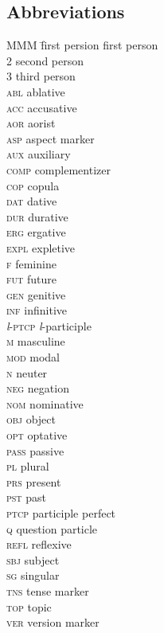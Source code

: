\documentclass[output=paper,colorlinks,citecolor=brown]{langscibook}
\begin{document}
\begin{otherlanguage}{english}
\section*{Abbreviations}
\begin{multicols}{3}
\begin{tabbing}
MMM \= first persion \> first person \\
2 \> second person \\
3 \> third person \\
\textsc{abl} \> ablative \\
\textsc{acc} \> accusative \\
\textsc{aor} \> aorist \\
\textsc{asp} \> aspect marker \\
\textsc{aux} \> auxiliary \\
\textsc{comp} \> complementizer \\
\textsc{cop} \> copula \\
\textsc{dat} \> dative \\
\textsc{dur} \> durative \\
\textsc{erg} \> ergative \\
\textsc{expl} \> expletive \\
\textsc{f} \> feminine \\
\textsc{fut} \> future \\
\textsc{gen} \> genitive \\
\textsc{inf} \> infinitive \\
\textit{l}-\textsc{ptcp} \> \textit{l}-participle \\
\textsc{m} \> masculine \\
\textsc{mod} \> modal \\
\textsc{n} \> neuter \\
\textsc{neg} \> negation \\
\textsc{nom} \> nominative \\
\textsc{obj} \> object \\
\textsc{opt} \> optative \\
\textsc{pass} \> passive \\
\textsc{pl} \> plural \\
\textsc{prs} \> present \\
\textsc{pst} \> past \\
\textsc{ptcp} \> participle perfect \\
\textsc{q} \> question particle \\
\textsc{refl} \> reflexive \\
\textsc{sbj} \> subject \\
\textsc{sg} \> singular \\
\textsc{tns} \> tense marker \\
\textsc{top} \> topic \\
\textsc{ver} \> version marker 
\end{tabbing}
\end{multicols}


\end{otherlanguage}
\end{document}
